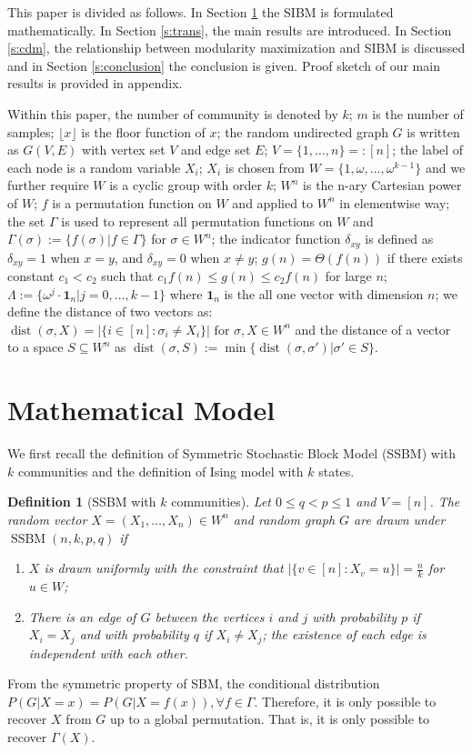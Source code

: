 \label{key}\documentclass[conference]{IEEEtran}
\newtheorem{definition}{Definition}%
\DeclareMathOperator{\SSBM}{SSBM}
\newcommand{\ide}[2]{ \delta_{#1 #2} }
\DeclareMathOperator{\dist}{dist}
\begin{document}
This paper is divided as follows. In Section \ref{s:Preliminaries} the SIBM is formulated mathematically.
In Section \ref{s:trans}, the main results are introduced.
In Section \ref{s:cdm}, the relationship between modularity maximization and SIBM is discussed 
and in Section \ref{s:conclusion} the conclusion is given.
Proof sketch of our main results is provided in appendix.

Within this paper, the number of community is denoted by $k$; $m$ is the number of samples; $\lfloor x \rfloor$ is the floor function of $x$; the random undirected graph $G$ is written as $G(V,E)$ with vertex set $V$ and edge set $E$;
$V=\{1,\dots, n\} =: [n]$;
the label of each node is a random variable $X_i$; $X_i$ is chosen from $W= \{1, \omega, \dots, \omega^{k-1}\}$ and we further require $W$
is a cyclic group with order $k$; $W^n$ is the n-ary Cartesian power of $W$; $f$ is a permutation function on $W$ and applied to $W^n$ in elementwise way; the set $\Gamma$ is used to represent all permutation functions on $W$ and $\Gamma(\sigma):=\{f(\sigma)| f\in \Gamma\}$ for $\sigma \in W^n$; the indicator function $\ide{x}{y}$ is defined as
$\ide{x}{y} = 1 $ when $x=y$, and $\ide{x}{y}=0$ when $x\neq y$; $g(n) = \Theta(f(n))$ if there exists constant $c_1 < c_2$ such that $c_1 f(n) \leq g(n) \leq c_2 f(n)$
for large $n$;
$\Lambda := \{ \omega^j  \cdot \mathbf{1}_n | j=0, \dots,k-1\}$
where $\mathbf{1}_n$ is the all one vector with dimension $n$;
we define the distance of two vectors as:
$\dist(\sigma, X)
=|\{i\in[n]:\sigma_i\neq X_i\}| \textrm{ for } \sigma,X\in W^n
$ and the distance of a vector to a space $S\subseteq W^n$
as
$\dist(\sigma,S)
:=\min\{\dist(\sigma, \sigma') | \sigma' \in S\}
$.

\section{Mathematical Model} \label{s:Preliminaries}
We first recall the definition of Symmetric Stochastic Block Model (SSBM) with $k$ communities \cite{Abbe17} and the definition of Ising model with $k$ states.
\begin{definition}[SSBM with $k$ communities] \label{def:SSBM}
Let $0\leq q<p\leq 1$ and $V=[n]$. The random vector $X=(X_1,\dots,X_n)\in W^n$ and random graph $G$ are drawn under $\SSBM(n,k,p,q)$ if
\begin{enumerate}
\item $X$ is drawn uniformly with the constraint that $|\{v \in [n] : X_v = u\}| = \frac{n}{k}$ for $u\in W$;

\item There is an edge of $G$ between the vertices $i$ and $j$ with probability $p$ if $X_i=X_j$ and with probability $q$ if $X_i \neq X_j$; the existence of each edge is independent with each other.
\end{enumerate}
\end{definition}
From the symmetric property of SBM, the conditional distribution $P(G|X=x) = P(G|X=f(x)), \forall f \in \Gamma$. Therefore, it is only possible to recover $X$ from $G$ up to a global permutation. That is, it is only possible to recover $\Gamma(X)$.
\end{document}
